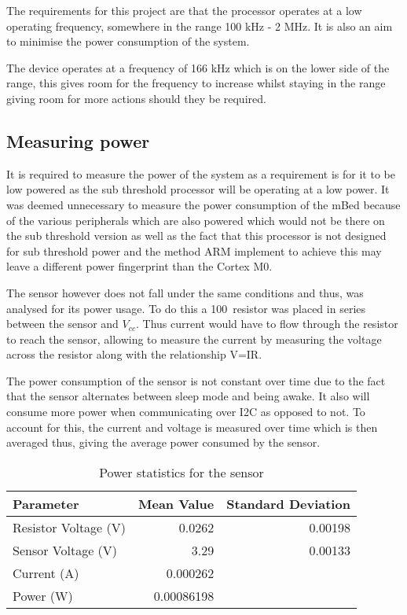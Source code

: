 
The requirements for this project are that the processor operates at a low operating frequency, somewhere in the range 100 kHz - 2 MHz. It is also an aim to minimise the power consumption of the system. 

The device operates at a frequency of 166 kHz which is on the lower side of the range, this gives room for the frequency to increase whilst staying in the range giving room for more actions should they be required.

\subsection{Measuring power}

It is required to measure the power of the system as a requirement is for it to be low powered as the sub threshold processor will be operating at a low power. It was deemed unnecessary to measure the power consumption of the mBed because of the various peripherals which are also powered which would not be there on the sub threshold version as well as the fact that this processor is not designed for sub threshold power and the method ARM implement to achieve this may leave a different power fingerprint than the Cortex M0. 

The sensor however does not fall under the same conditions and thus, was analysed for its power usage. To do this a 100\ohm ~resistor was placed in series between the sensor and $V_{cc}$. Thus current would have to flow through the resistor to reach the sensor, allowing to measure the current by measuring the voltage across the resistor along with the relationship V=IR.

The power consumption of the sensor is not constant over time due to the fact that the sensor alternates between sleep mode and being awake. It also will consume more power when communicating over I2C as opposed to not. To account for this, the current and voltage is measured over time which is then averaged thus, giving the average power consumed by the sensor.

\begin{table}
    \centering
    \begin{tabular}{|l|r|r|}
        \hline
        Parameter & Mean Value & Standard Deviation \\
        \hline
        Resistor Voltage (V) & 0.0262 & 0.00198 \\
        Sensor Voltage (V) & 3.29 & 0.00133 \\
        Current (A) & 0.000262 & \\
        Power (W) & 0.00086198 & \\
        \hline
    \end{tabular}
    \caption{Power statistics for the sensor}
    \label{tab:power}
\end{table}

